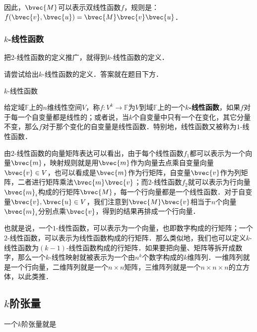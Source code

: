 因此，$\bvec{M}$可以表示双线性函数$f$，规则是：$f(\bvec{v}, \bvec{u})=\bvec{M}\bvec{v}\bvec{u}$．

\subsubsection{$k$-线性函数}

把$2$-线性函数的定义推广，就得到$k$-线性函数的定义．

\begin{exercise}{}
请尝试给出$k$-线性函数的定义．答案就在题目下方．
\end{exercise}

\begin{definition}{$k$-线性函数}

给定域$\mathbb{F}$上的$n$维线性空间$V$，称$f:V^k\rightarrow \mathbb{F}$为$V$到域$\mathbb{F}$上的一个\textbf{$k$-线性函数}，如果$f$对于每一个自变量都是线性的；或者说，当$k$个自变量中只有一个在变化，其它分量不变，那么$f$对于那个变化的自变量是线性函数．特别地，线性函数又被称为$1$-线性函数．

\end{definition}

由$2$-线性函数的向量矩阵表达可以看出，由于每个线性函数$f_1$都可以表示为一个向量$\bvec{m}$，映射规则就是用$\bvec{m}$作为向量去点乘自变量向量$\bvec{v}\in V$，也可以看成是$\bvec{m}$作为行矩阵，自变量$\bvec{v}$作为列矩阵，二者进行矩阵乘法$\bvec{m}\bvec{v}$；而$2$-线性函数$f_2$就可以表示为行向量$\bvec{m}_i$构成的行矩阵$\bvec{M}$，每一个行向量都是一个线性函数．对于自变量$\bvec{v}, \bvec{u}\in V$，我们注意到$\bvec{M}\bvec{v}$相当于$n$个向量$\bvec{m}_i$分别点乘$\bvec{v}$，得到的结果再排成一个行向量．

也就是说，一个$1$-线性函数，可以表示为一个向量，也即数字构成的行矩阵；一个$2$-线性函数，可以表示为线性函数构成的行矩阵．那么类似地，我们也可以定义$k$-线性函数为$(k-1)$-线性函数构成的行矩阵．如果要把向量、矩阵等拆开成数字，那么一个$k$-线性映射就被表示为一个由$n^k$个数字构成的$k$维阵列．一维阵列就是一个行向量，二维阵列就是一个$n\times n$矩阵，三维阵列就是一个$n\times n\times n$的立方体，以此类推．

\subsection{$k$阶张量}

一个$k$阶张量就是


